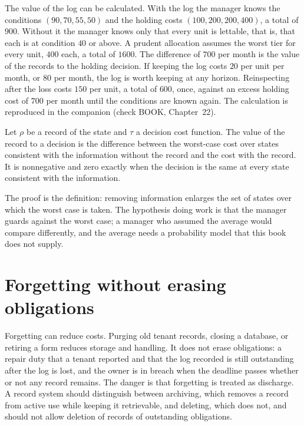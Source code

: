 The value of the log can be calculated. With the log the manager knows the conditions $(90,70,55,50)$ and the holding costs $(100,200,200,400)$, a total of $900$. Without it the manager knows only that every unit is lettable, that is, that each is at condition $40$ or above. A prudent allocation assumes the worst tier for every unit, $400$ each, a total of $1600$. The difference of $700$ per month is the value of the records to the holding decision. If keeping the log costs $20$ per unit per month, or $80$ per month, the log is worth keeping at any horizon. Reinspecting after the loss costs $150$ per unit, a total of $600$, once, against an excess holding cost of $700$ per month until the conditions are known again. The calculation is reproduced in the companion (check BOOK, Chapter~22).

\begin{proposition}\label{prop:record-value}
Let $\rho$ be a record of the state and $\tau$ a decision cost function. The value of the record to a decision is the difference between the worst-case cost over states consistent with the information without the record and the cost with the record. It is nonnegative and zero exactly when the decision is the same at every state consistent with the information.
\end{proposition}

The proof is the definition: removing information enlarges the set of states over which the worst case is taken. The hypothesis doing work is that the manager guards against the worst case; a manager who assumed the average would compare differently, and the average needs a probability model that this book does not supply.

\section{Forgetting without erasing obligations}

Forgetting can reduce costs. Purging old tenant records, closing a database, or retiring a form reduces storage and handling. It does not erase obligations: a repair duty that a tenant reported and that the log recorded is still outstanding after the log is lost, and the owner is in breach when the deadline passes whether or not any record remains. The danger is that forgetting is treated as discharge. A record system should distinguish between archiving, which removes a record from active use while keeping it retrievable, and deleting, which does not, and should not allow deletion of records of outstanding obligations.

